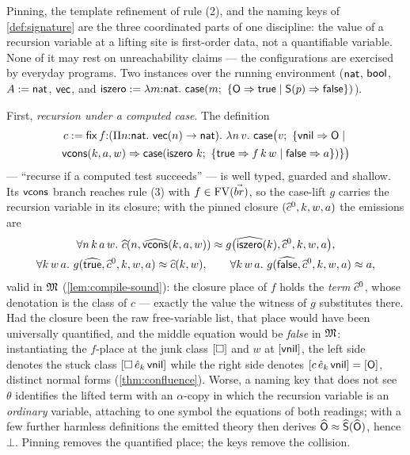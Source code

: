 \begin{remark}
\label{rem:rec-closure}
Pinning, the template refinement of rule (2), and the naming keys of
\cref{def:signature} are the three coordinated parts of one
discipline: the value of a recursion variable at a lifting site is
first-order data, not a quantifiable variable.  None of it may rest on
unreachability claims --- the configurations are exercised by everyday
programs.  Two instances over the running environment ($\mathsf{nat}$, $\mathsf{bool}$,
$A \mathrel{:=} \mathsf{nat}$, $\mathsf{vec}$, and $\mathsf{iszero} \mathrel{:=} \lambda
m{:}\mathsf{nat}.\ \mathsf{case}(m;\ \{\mathsf{O} \Rightarrow \mathsf{true} \mid \mathsf{S}(p)
\Rightarrow \mathsf{false}\})$).

First, \emph{recursion under a computed case}.  The definition
\begin{multline*}
  c \mathrel{:=} \mathsf{fix}\,f{:}(\Pi n{:}\mathsf{nat}.\ \mathsf{vec}(n) \to \mathsf{nat}).\
  \lambda n\,v.\ \mathsf{case}\bigl(v;\ \{\mathsf{vnil} \Rightarrow \mathsf{O}
  \mid {}\\
  \mathsf{vcons}(k,a,w) \Rightarrow
  \mathsf{case}(\mathsf{iszero}\ k;\ \{\mathsf{true} \Rightarrow f\,k\,w
  \mid \mathsf{false} \Rightarrow a\})\}\bigr)
\end{multline*}
--- ``recurse if a computed test succeeds'' --- is well typed, guarded
and shallow.  Its $\mathsf{vcons}$ branch reaches rule (3) with $f \in
\mathrm{FV}(\vec{br})$, so the case-lift $g$ carries the recursion variable in
its closure; with the pinned closure $(\widehat{c}^0, k, w, a)$ the
emissions are
\begin{gather*}
  \forall n\,k\,a\,w.\ \widehat{c}(n, \widehat{\mathsf{vcons}}(k,a,w)) \approx
    g\bigl(\widehat{\mathsf{iszero}}(k), \widehat{c}^0, k, w, a\bigr),\\
  \forall k\,w\,a.\ g(\widehat{\mathsf{true}}, \widehat{c}^0, k, w, a) \approx
    \widehat{c}(k, w), \qquad
  \forall k\,w\,a.\ g(\widehat{\mathsf{false}}, \widehat{c}^0, k, w, a) \approx a,
\end{gather*}
valid in $\mathfrak{M}$ (\cref{lem:compile-sound}): the closure place of $f$
holds the \emph{term} $\widehat{c}^0$, whose denotation is the class of
$c$ --- exactly the value the witness of $g$ substitutes there.  Had
the closure been the raw free-variable list, that place would have
been universally quantified, and the middle equation would be
\emph{false} in $\mathfrak{M}$: instantiating the $f$-place at the junk class
$[\square]$ and $w$ at $[\mathsf{vnil}]$, the left side denotes the
stuck class $[\square\,\hat{e}_k\,\mathsf{vnil}]$ while the right side
denotes $[c\,\hat{e}_k\,\mathsf{vnil}] = [\mathsf{O}]$, distinct normal
forms (\cref{thm:confluence}).  Worse, a naming key that does not see
$\theta$ identifies the lifted term with an $\alpha$-copy in which the
recursion variable is an \emph{ordinary} variable, attaching to one
symbol the equations of both readings; with a few further harmless
definitions the emitted theory then derives $\widehat{\mathsf{O}} \approx
\widehat{\mathsf{S}}(\widehat{\mathsf{O}})$, hence $\bot$.  Pinning removes the
quantified place; the keys remove the collision.


\end{remark}
